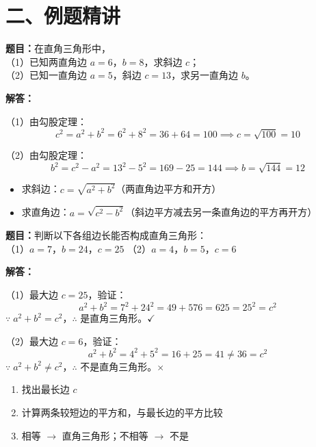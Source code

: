 \documentclass[12pt, a4paper]{ctexart}
\begin{document}
\section*{\textcolor{examorange}{二、例题精讲}}

\begin{examplebox}
\textbf{题目：}在直角三角形中，\\
（1）已知两直角边 $a=6$，$b=8$，求斜边 $c$；\\
（2）已知一直角边 $a=5$，斜边 $c=13$，求另一直角边 $b$。

\vspace{6pt}
\textbf{解答：}

（1）由勾股定理：
\[
c^2 = a^2 + b^2 = 6^2 + 8^2 = 36 + 64 = 100 \implies c = \sqrt{100} = \boxed{10}
\]

（2）由勾股定理：
\[
b^2 = c^2 - a^2 = 13^2 - 5^2 = 169 - 25 = 144 \implies b = \sqrt{144} = \boxed{12}
\]
\end{examplebox}

\begin{tipbox}[方法总结]
\begin{itemize}[leftmargin=1.5em, itemsep=2pt]
  \item 求斜边：$c = \sqrt{a^2 + b^2}$（两直角边平方和开方）
  \item 求直角边：$a = \sqrt{c^2 - b^2}$（斜边平方减去另一条直角边的平方再开方）
\end{itemize}
\end{tipbox}

\begin{examplebox}[【例题2】判断三角形是否为直角三角形]
\textbf{题目：}判断以下各组边长能否构成直角三角形：\\
（1）$a=7$，$b=24$，$c=25$ \qquad
（2）$a=4$，$b=5$，$c=6$

\vspace{6pt}
\textbf{解答：}

（1）最大边 $c=25$，验证：
\[
a^2 + b^2 = 7^2 + 24^2 = 49 + 576 = 625 = 25^2 = c^2
\]
$\because\; a^2+b^2=c^2$，$\therefore$ 是直角三角形。\quad $\checkmark$

\vspace{4pt}
（2）最大边 $c=6$，验证：
\[
a^2 + b^2 = 4^2 + 5^2 = 16 + 25 = 41 \neq 36 = c^2
\]
$\because\; a^2+b^2 \neq c^2$，$\therefore$ 不是直角三角形。\quad $\times$
\end{examplebox}

\begin{tipbox}[方法总结]
\begin{enumerate}[leftmargin=1.5em, itemsep=2pt]
  \item 找出最长边 $c$
  \item 计算两条较短边的平方和，与最长边的平方比较
  \item 相等 $\to$ 直角三角形；不相等 $\to$ 不是
\end{enumerate}
\end{tipbox}
\end{document}
